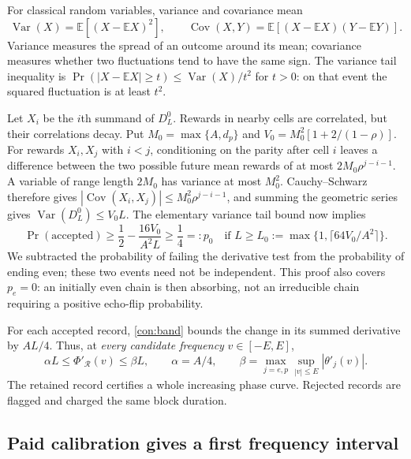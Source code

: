 \documentclass[11pt,a4paper]{article}
\numberwithin{equation}{section}
\theoremstyle{remark}
\DeclareMathOperator{\Var}{Var}
\DeclareMathOperator{\Cov}{Cov}
\newcommand{\E}{\mathbb E}
\begin{document}
For classical random variables, variance and covariance mean
\begin{equation}
 \Var(X)=\E[(X-\E X)^2],\qquad
 \Cov(X,Y)=\E[(X-\E X)(Y-\E Y)].
\end{equation}
Variance measures the spread of an outcome around its mean; covariance
measures whether two fluctuations tend to have the same sign.
The variance tail inequality is
$\Pr(|X-\E X|\ge t)\le\Var(X)/t^2$ for $t>0$:
on that event the squared fluctuation is at least $t^2$.

Let $X_i$ be the $i$th summand of $D_L^0$.
Rewards in nearby cells are correlated, but their correlations decay.
Put $M_0=\max\{A,d_p\}$ and $V_0=M_0^2[1+2/(1-\rho)]$.
For rewards $X_i,X_j$ with $i<j$, conditioning on the parity after cell
$i$ leaves a difference between the two possible future mean rewards of
at most $2M_0\rho^{j-i-1}$. A variable of range length $2M_0$ has variance
at most $M_0^2$. Cauchy--Schwarz therefore gives
$|\Cov(X_i,X_j)|\le M_0^2\rho^{j-i-1}$, and summing the geometric series gives
$\Var(D_L^0)\le V_0L$. The elementary variance tail bound now implies
\begin{equation}
 \Pr(\text{accepted})\ge\frac12-\frac{16V_0}{A^2L}
 \ge\frac14=:p_0
 \quad\text{if }L\ge L_0:=\max\{1,\lceil64V_0/A^2\rceil\}.
 \label{con:acceptance}
\end{equation}
We subtracted the probability of failing the derivative test from the
probability of ending even; these two events need not be independent.
This proof also covers $p_e=0$: an initially even chain is then absorbing,
not an irreducible chain requiring a positive echo-flip probability.

For each accepted record, \eqref{con:band} bounds the change in its
summed derivative by $AL/4$. Thus, at \emph{every candidate frequency}
$v\in[-E,E]$,
\begin{equation}
 \alpha L\le\Phi'_{\mathcal R}(v)\le\beta L,
 \qquad \alpha=A/4,\qquad
 \beta=\max_{j=e,p}\sup_{|v|\le E}|\theta'_j(v)|.
 \label{con:sensitivity}
\end{equation}
The retained record certifies a whole increasing phase curve. Rejected
records are flagged and charged the same block duration.

\subsection{Paid calibration gives a first frequency interval}
\label{con:calibration}
\end{document}

